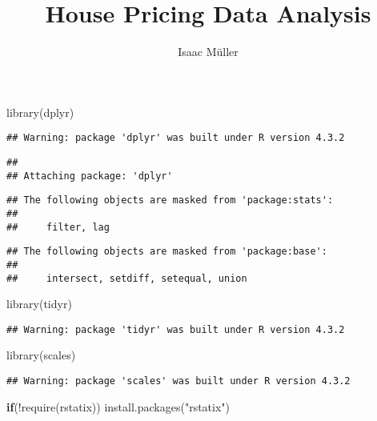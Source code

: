 \documentclass[
]{article}
\title{House Pricing Data Analysis}
\author{Isaac Müller}
\date{}
\newenvironment{Shaded}{\begin{snugshade}}{\end{snugshade}}
\newcommand{\ControlFlowTok}[1]{\textcolor[rgb]{0.13,0.29,0.53}{\textbf{#1}}}
\newcommand{\FunctionTok}[1]{\textcolor[rgb]{0.00,0.00,0.00}{#1}}
\newcommand{\NormalTok}[1]{#1}
\newcommand{\SpecialCharTok}[1]{\textcolor[rgb]{0.00,0.00,0.00}{#1}}
\newcommand{\StringTok}[1]{\textcolor[rgb]{0.31,0.60,0.02}{#1}}
\begin{document}
\maketitle

\begin{Shaded}
\begin{Highlighting}[]
\FunctionTok{library}\NormalTok{(dplyr)}
\end{Highlighting}
\end{Shaded}

\begin{verbatim}
## Warning: package 'dplyr' was built under R version 4.3.2
\end{verbatim}

\begin{verbatim}
## 
## Attaching package: 'dplyr'
\end{verbatim}

\begin{verbatim}
## The following objects are masked from 'package:stats':
## 
##     filter, lag
\end{verbatim}

\begin{verbatim}
## The following objects are masked from 'package:base':
## 
##     intersect, setdiff, setequal, union
\end{verbatim}

\begin{Shaded}
\begin{Highlighting}[]
\FunctionTok{library}\NormalTok{(tidyr)}
\end{Highlighting}
\end{Shaded}

\begin{verbatim}
## Warning: package 'tidyr' was built under R version 4.3.2
\end{verbatim}

\begin{Shaded}
\begin{Highlighting}[]
\FunctionTok{library}\NormalTok{(scales)}
\end{Highlighting}
\end{Shaded}

\begin{verbatim}
## Warning: package 'scales' was built under R version 4.3.2
\end{verbatim}

\begin{Shaded}
\begin{Highlighting}[]
\ControlFlowTok{if}\NormalTok{(}\SpecialCharTok{!}\FunctionTok{require}\NormalTok{(rstatix)) }\FunctionTok{install.packages}\NormalTok{(}\StringTok{"rstatix"}\NormalTok{)}
\end{Highlighting}
\end{Shaded}
\end{document}
